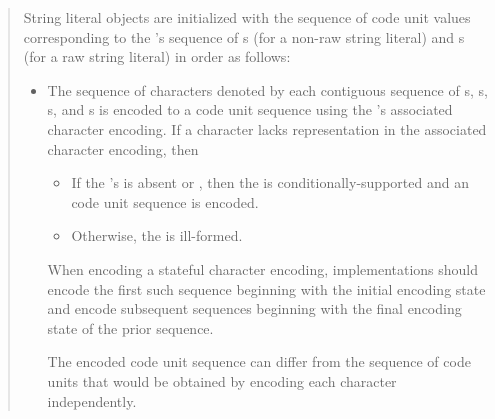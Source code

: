 \documentclass{wg21}
\begin{document}
    \begin{quote}
        
        String literal objects are initialized with
        the sequence of code unit values
        corresponding to the 's sequence of
        s (for a non-raw string literal) and
        s (for a raw string literal)
        in order as follows:
        \begin{itemize}
            \item
            The sequence of characters denoted by each contiguous sequence of
            s,
            s,
            s, and
            s
            is encoded to a code unit sequence
            using the 's associated character encoding.
            If a character lacks representation in the associated character encoding, then 
            \begin{removedblock}
                \begin{itemize}
                    \item
                    If the 's 
                    is absent or ,
                    then the  is conditionally-supported and
                    an
                    code unit sequence is encoded.
                    \item
                    Otherwise, the  is ill-formed.
                \end{itemize}
            \end{removedblock}
            When encoding a stateful character encoding,
            implementations should encode the first such sequence
            beginning with the initial encoding state and
            encode subsequent sequences
            beginning with the final encoding state of the prior sequence.
            \begin{note}
                The encoded code unit sequence can differ from
                the sequence of code units that would be obtained by
                encoding each character independently.
            \end{note}

\end{itemize}
\end{quote}
\end{document}
